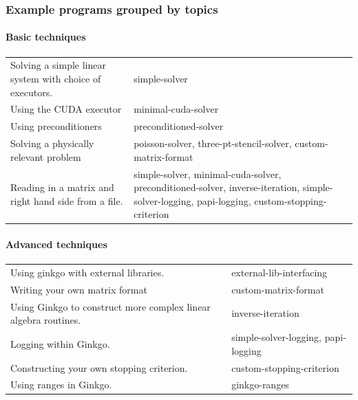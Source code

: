 \label{_topic}%
 \subsubsection*{Example programs grouped by topics}

\paragraph*{{\bfseries Basic techniques}}

\tabulinesep=1mm
\begin{longtabu} spread 0pt [c]{*{2}{|X[-1]}|}
\hline
Solving a simple linear system with choice of executors.  &simple-\/solver  

\\
Using the C\+U\+DA executor  &minimal-\/cuda-\/solver  

\\
Using preconditioners  &preconditioned-\/solver  

\\
Solving a physically relevant problem  &poisson-\/solver, three-\/pt-\/stencil-\/solver, custom-\/matrix-\/format  

\\
Reading in a matrix and right hand side from a file.  &simple-\/solver, minimal-\/cuda-\/solver, preconditioned-\/solver, inverse-\/iteration, simple-\/solver-\/logging, papi-\/logging, custom-\/stopping-\/criterion  

\\
\end{longtabu}


\paragraph*{{\bfseries Advanced techniques}}

\tabulinesep=1mm
\begin{longtabu} spread 0pt [c]{*{2}{|X[-1]}|}
\hline
Using ginkgo with external libraries.  &external-\/lib-\/interfacing  

\\
Writing your own matrix format  &custom-\/matrix-\/format  

\\
Using Ginkgo to construct more complex linear algebra routines.  &inverse-\/iteration  

\\
Logging within Ginkgo.  &simple-\/solver-\/logging, papi-\/logging  

\\
Constructing your own stopping criterion.  &custom-\/stopping-\/criterion  

\\
Using ranges in Ginkgo.  &ginkgo-\/ranges   \\
\end{longtabu}
